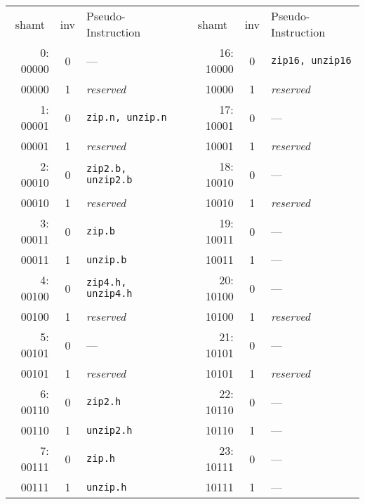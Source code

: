 \begin{table}[h]
\begin{small}
\begin{center}
\begin{tabular}{r c l p{1in} r c l}
\multicolumn{1}{c}{shamt} &
\multicolumn{1}{c}{inv} &
Pseudo-Instruction & &
\multicolumn{1}{c}{shamt} &
\multicolumn{1}{c}{inv} &
Pseudo-Instruction \\

\cline{1-3}
\cline{5-7}

 0: 00000 & 0 & ---                      &   &   16: 10000 & 0 & {\tt zip16, unzip16}    \\
    00000 & 1 & {\it reserved}           &   &       10000 & 1 & {\it reserved}          \\
 1: 00001 & 0 & {\tt zip.n, unzip.n}     &   &   17: 10001 & 0 & ---                     \\
    00001 & 1 & {\it reserved}           &   &       10001 & 1 & {\it reserved}          \\
 2: 00010 & 0 & {\tt zip2.b, unzip2.b}   &   &   18: 10010 & 0 & ---                     \\
    00010 & 1 & {\it reserved}           &   &       10010 & 1 & {\it reserved}          \\
 3: 00011 & 0 & {\tt zip.b}              &   &   19: 10011 & 0 & ---                     \\
    00011 & 1 & {\tt unzip.b}            &   &       10011 & 1 & ---                     \\

\cline{1-3}
\cline{5-7}

 4: 00100 & 0 & {\tt zip4.h, unzip4.h}   &   &   20: 10100 & 0 & ---                     \\
    00100 & 1 & {\it reserved}           &   &       10100 & 1 & {\it reserved}          \\
 5: 00101 & 0 & ---                      &   &   21: 10101 & 0 & ---                     \\
    00101 & 1 & {\it reserved}           &   &       10101 & 1 & {\it reserved}          \\
 6: 00110 & 0 & {\tt zip2.h}             &   &   22: 10110 & 0 & ---                     \\
    00110 & 1 & {\tt unzip2.h}           &   &       10110 & 1 & ---                     \\
 7: 00111 & 0 & {\tt zip.h}              &   &   23: 10111 & 0 & ---                     \\
    00111 & 1 & {\tt unzip.h}            &   &       10111 & 1 & ---                     \\


\end{tabular}
\end{center}
\end{small}
\end{table}
